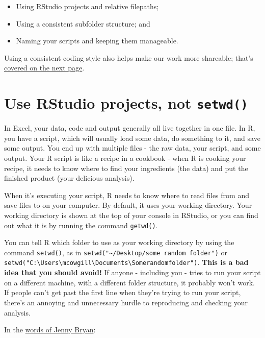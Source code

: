 \documentclass[
]{book}
\providecommand{\tightlist}{%
  \setlength{\itemsep}{0pt}\setlength{\parskip}{0pt}}
\begin{document}
\begin{itemize}
\tightlist
\item
  Using RStudio projects and relative filepaths;
\item
  Using a consistent subfolder structure; and
\item
  Naming your scripts and keeping them manageable.
\end{itemize}

Using a consistent coding style also helps make our work more shareable; that's \protect\hyperlink{coding-style}{covered on the next page}.

\hypertarget{rproj}{%
\section{\texorpdfstring{Use RStudio projects, not \texttt{setwd()}}{Use RStudio projects, not setwd()}}\label{rproj}}

In Excel, your data, code and output generally all live together in one file. In R, you have a script, which will usually load some data, do something to it, and save some output. You end up with multiple files - the raw data, your script, and some output. Your R script is like a recipe in a cookbook - when R is cooking your recipe, it needs to know where to find your ingredients (the data) and put the finished product (your delicious analysis).

When it's executing your script, R needs to know where to read files from and save files to on your computer. By default, it uses your working directory. Your working directory is shown at the top of your console in RStudio, or you can find out what it is by running the command \texttt{getwd()}.

You can tell R which folder to use as your working directory by using the command \texttt{setwd()}, as in \texttt{setwd("\textasciitilde{}/Desktop/some\ random\ folder")} or \texttt{setwd("C:\textbackslash{}Users\textbackslash{}mcowgill\textbackslash{}Documents\textbackslash{}Somerandomfolder")}. \textbf{This is a bad idea that you should avoid!} If anyone - including you - tries to run your script on a different machine, with a different folder structure, it probably won't work. If people can't get past the first line when they're trying to run your script, there's an annoying and unnecessary hurdle to reproducing and checking your analysis.

In the \href{https://www.tidyverse.org/articles/2017/12/workflow-vs-script/}{words of Jenny Bryan}:
\end{document}
